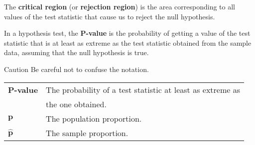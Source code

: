 \documentclass{beamer}
\begin{document}
\begin{frame}[fragile]
\begin{definition}
The \textbf{critical region} (or \textbf{rejection region}) is the area corresponding to all values of the test statistic that cause us to reject the null hypothesis.
\end{definition}\pause

\begin{definition}
In a hypothesis test, the \textbf{$\boldsymbol{P}$-value} is the probability of getting a value of the test statistic that is at least as extreme as the test statistic obtained from the sample data, assuming that the null hypothesis is true.
\end{definition}\pause

\begin{block}{Caution}
Be careful not to confuse the notation.
\begin{center}
\begin{tabular}{ll}
\textbf{$\boldsymbol{P}$-value} & The probability of a test statistic at least as extreme as \\
&the one obtained.\\
$\boldsymbol{p}$ & The population proportion.\\
$\boldsymbol{\hat{p}}$ & The sample proportion.
\end{tabular}
\end{center}
\end{block}
\end{frame}
\end{document}
